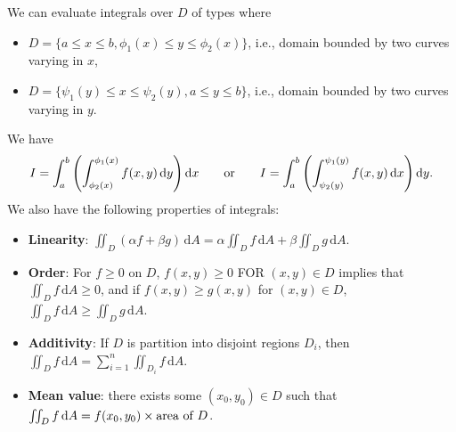 \documentclass[letter-paper]{tufte-book}
\newcommand\Def[1]{\textbf{#1}}
\begin{document}
We can evaluate integrals over $D$ of types where
\begin{itemize}
  \item $D=\{a\leq x\leq b, \phi_1(x) \leq y \leq \phi_2(x)\}$, i.e., domain
  bounded by two curves varying in $x$,
  \item $D=\{\psi_1(y) \leq x \leq \psi_2(y), a\leq y\leq b\}$, i.e., domain
  bounded by two curves varying in $y$.
\end{itemize}
We have
\begin{equation*}
  I = \int_a^b \left(\int_{\phi_2(x)}^{\phi_1(x)} f(x,y)\, \mathrm{d}y\right)
  \mathrm{d}x \qquad\textnormal{or}\qquad
  I = \int_a^b \left(\int_{\psi_2(y)}^{\psi_1(y)} f(x,y)\, \mathrm{d}x\right)
  \mathrm{d}y.
\end{equation*}
We also have the following properties of integrals:
\begin{itemize}
  \item \Def{Linearity}: $\iint_D (\alpha f + \beta g)\, \mathrm{d}A =
  \alpha \iint_D f\, \mathrm{d}A + \beta \iint_D g\, \mathrm{d}A$.
  
  \item \Def{Order}: For $f \geq 0$ on $D$, $f(x,y) \geq 0$ FOR $(x,y)\in
  D$ implies that $\iint_D f\, \mathrm{d}A \geq 0$, and if $f(x,y) \geq g(x,y)$
  for $(x,y) \in D$, $\iint_D f\, \mathrm{d}A \geq \iint_D g\, \mathrm{d}A$.
  
  \item \Def{Additivity}: If $D$ is partition into disjoint regions $D_i$,
  then $\iint_D f\, \mathrm{d}A = \sum_{i=1}^n \iint_{D_i} f\, \mathrm{d}A$.
  
  \item \Def{Mean value}: there exists some $(x_0, y_0) \in D$ such that
  $\iint_D f\, \mathrm{d}A = f(x_0,y_0)\times\textnormal{area of }D$.
\end{itemize}
\end{document}

